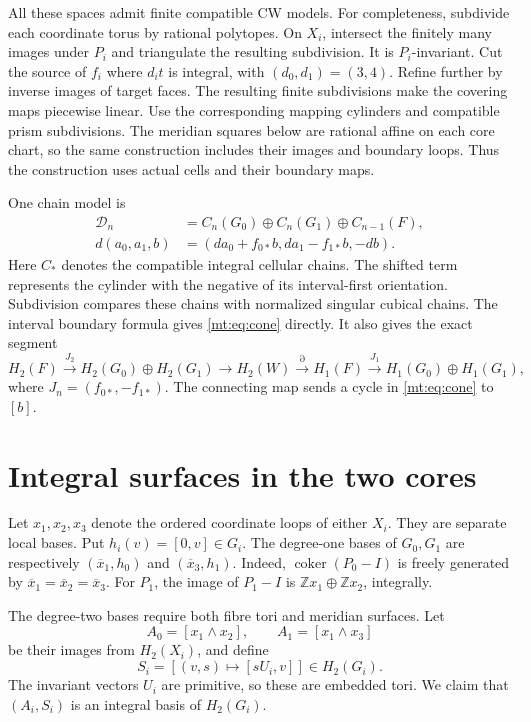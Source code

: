 All these spaces admit finite compatible CW models.
For completeness, subdivide each coordinate torus by rational polytopes.
On $X_i$, intersect the finitely many images under $P_i$ and triangulate
the resulting subdivision. It is $P_i$-invariant.
Cut the source of $f_i$ where $d_it$ is integral, with $(d_0,d_1)=(3,4)$.
Refine further by inverse images of target faces.
The resulting finite subdivisions make the covering maps piecewise linear.
Use the corresponding mapping cylinders and compatible prism subdivisions.
The meridian squares below are rational affine on each core chart,
so the same construction includes their images and boundary loops.
Thus the construction uses actual cells and their boundary maps.

One chain model is
\begin{equation}\label{mt:eq:cone}
\begin{aligned}
\mathcal D_n&=C_n(G_0)\oplus C_n(G_1)\oplus C_{n-1}(F),\\
d(a_0,a_1,b)&=(da_0+f_{0*}b,da_1-f_{1*}b,-db).
\end{aligned}
\end{equation}
Here $C_*$ denotes the compatible integral cellular chains.
The shifted term represents the cylinder with the negative of its
interval-first orientation.
Subdivision compares these chains with normalized singular cubical chains.
The interval boundary formula gives \eqref{mt:eq:cone} directly.
It also gives the exact segment
\begin{equation}\label{mt:eq:MV}
H_2(F)\xrightarrow{J_2}H_2(G_0)\oplus H_2(G_1)
\longrightarrow H_2(W)\xrightarrow{\partial}H_1(F)
\xrightarrow{J_1}H_1(G_0)\oplus H_1(G_1),
\end{equation}
where $J_n=(f_{0*},-f_{1*})$.
The connecting map sends a cycle in \eqref{mt:eq:cone} to $[b]$.

\section{Integral surfaces in the two cores}

Let $x_1,x_2,x_3$ denote the ordered coordinate loops of either $X_i$.
They are separate local bases. Put $h_i(v)=[0,v]\in G_i$.
The degree-one bases of $G_0,G_1$ are respectively
$(\overline x_1,h_0)$ and $(\overline x_3,h_1)$.
Indeed, $\operatorname{coker}(P_0-I)$ is freely generated by
$\overline x_1=\overline x_2=\overline x_3$.
For $P_1$, the image of $P_1-I$ is
$\mathbb Zx_1\oplus\mathbb Zx_2$, integrally.

The degree-two bases require both fibre tori and meridian surfaces.
Let
\[
A_0=[x_1\wedge x_2],\qquad A_1=[x_1\wedge x_3]
\]
be their images from $H_2(X_i)$, and define
\begin{equation}\label{mt:eq:S}
S_i=[(v,s)\longmapsto[sU_i,v]]\in H_2(G_i).
\end{equation}
The invariant vectors $U_i$ are primitive, so these are embedded tori.
We claim that $(A_i,S_i)$ is an integral basis of $H_2(G_i)$.


